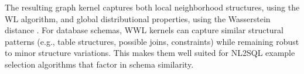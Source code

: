 The resulting graph kernel captures both local neighborhood structures, using
the WL algorithm, and global distributional properties, using the Wasserstein
distance \citep{WWL}. For database schemas, WWL kernels can capture similar
structural patterns (e.g., table structures, possible joins, constraints) while
remaining robust to minor structure variations. This makes them well suited for
NL2SQL example selection algorithms that factor in schema similarity.
